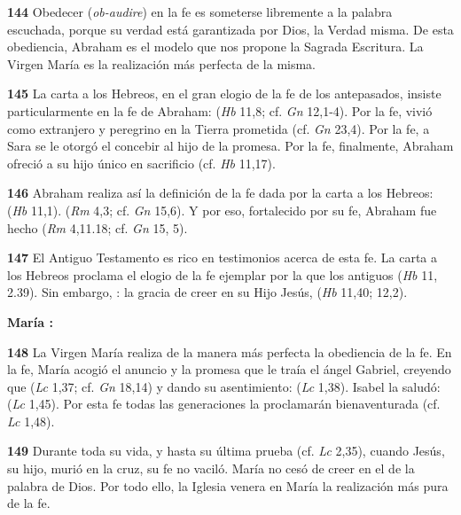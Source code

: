 \textbf{144} Obedecer (\emph{ob-audire}) en la fe es someterse libremente a la palabra escuchada, porque su verdad está garantizada por Dios, la Verdad misma. De esta obediencia, Abraham es el modelo que nos propone la Sagrada Escritura. La Virgen María es la realización más perfecta de la misma.

\textbf{145} La carta a los Hebreos, en el gran elogio de la fe de los antepasados, insiste particularmente en la fe de Abraham:  (\emph{Hb} 11,8; cf. \emph{Gn} 12,1-4). Por la fe, vivió como extranjero y peregrino en la Tierra prometida (cf. \emph{Gn} 23,4). Por la fe, a Sara se le otorgó el concebir al hijo de la promesa. Por la fe, finalmente, Abraham ofreció a su hijo único en sacrificio (cf. \emph{Hb} 11,17).

\textbf{146} Abraham realiza así la definición de la fe dada por la carta a los Hebreos:  (\emph{Hb} 11,1).  (\emph{Rm} 4,3; cf. \emph{Gn} 15,6). Y por eso, fortalecido por su fe, Abraham fue hecho  (\emph{Rm} 4,11.18; cf. \emph{Gn} 15, 5).

\textbf{147} El Antiguo Testamento es rico en testimonios acerca de esta fe. La carta a los Hebreos proclama el elogio de la fe ejemplar por la que los antiguos  (\emph{Hb} 11, 2.39). Sin embargo, : la gracia de creer en su Hijo Jesús,  (\emph{Hb} 11,40; 12,2).

\textbf{María : }

\textbf{148} La Virgen María realiza de la manera más perfecta la obediencia de la fe. En la fe, María acogió el anuncio y la promesa que le traía el ángel Gabriel, creyendo que  (\emph{Lc} 1,37; cf. \emph{Gn} 18,14) y dando su asentimiento:  (\emph{Lc} 1,38). Isabel la saludó:  (\emph{Lc} 1,45). Por esta fe todas las generaciones la proclamarán bienaventurada (cf. \emph{Lc} 1,48).

\textbf{149} Durante toda su vida, y hasta su última prueba (cf. \emph{Lc} 2,35), cuando Jesús, su hijo, murió en la cruz, su fe no vaciló. María no cesó de creer en el  de la palabra de Dios. Por todo ello, la Iglesia venera en María la realización más pura de la fe.

